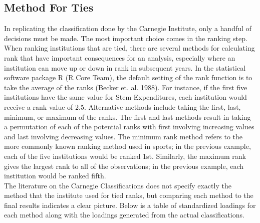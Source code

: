 \documentclass{article}
\begin{document}
  \subsection{Method For Ties}
 In replicating the classification done by the Carnegie Institute, only a handful of decisions must be made. The most important choice comes in the ranking step. When ranking institutions that are tied, there are several methods for calculating rank that have important consequences for an analysis, especially where an institution can move up or down in rank in subsequent years. In the statistical software package R (R Core Team), the default setting of the rank function is to take the average of the ranks (Becker et. al. 1988). For instance, if the first five institutions have the same value for Stem Expenditures, each institution would receive a rank value of 2.5.  Alternative methods include taking the first, last, minimum, or maximum of the ranks.  The first and last methods result in taking a permutation of each of the potential ranks with first involving increasing values and last involving decreasing values. The minimum rank method refers to the more commonly known ranking method used in sports; in the previous example, each of the five institutions would be ranked 1st. Similarly, the maximum rank gives the largest rank to all of the observations; in the previous example, each institution would be ranked fifth. \\
The literature on the Carnegie Classifications does not specify exactly the method that the institute used for tied ranks, but comparing each method to the final results indicates a clear picture. Below is a table of standardized loadings for each method along with the loadings generated from the actual classifications. 
\end{document}
